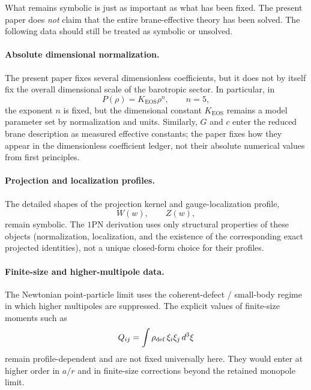 \documentclass[11pt]{article}
\newcommand{\Wproj}{W}
\newcommand{\Zloc}{Z}
\newcommand{\KEOS}{K_{\mathrm{EOS}}}
\begin{document}
What remains symbolic is just as important as what has been fixed. The present paper does
\emph{not} claim that the entire brane-effective theory has been solved. The following
data should still be treated as symbolic or unsolved.

\paragraph{Absolute dimensional normalization.}
The present paper fixes several dimensionless coefficients, but it does not by itself fix
the overall dimensional scale of the barotropic sector. In particular, in
\begin{equation}
P(\rho)=\KEOS \rho^n,
\qquad n=5,
\label{eq:symbolic-KEOS}
\end{equation}
the exponent \(n\) is fixed, but the dimensional constant \(\KEOS\) remains a model
parameter set by normalization and units. Similarly, \(G\) and \(c\) enter the reduced
brane description as measured effective constants; the paper fixes how they appear in the
dimensionless coefficient ledger, not their absolute numerical values from first
principles.

\paragraph{Projection and localization profiles.}
The detailed shapes of the projection kernel and gauge-localization profile,
\begin{equation}
\Wproj(w),
\qquad
\Zloc(w),
\label{eq:symbolic-profiles}
\end{equation}
remain symbolic. The \(1\)PN derivation uses only structural properties of these objects
(normalization, localization, and the existence of the corresponding exact projected
identities), not a unique closed-form choice for their profiles.

\paragraph{Finite-size and higher-multipole data.}
The Newtonian point-particle limit uses the coherent-defect / small-body regime in which
higher multipoles are suppressed. The explicit values of finite-size moments such as
\begin{equation}
Q_{ij}=\int \rho_{\rm def}\,\xi_i\xi_j\,d^3\xi
\label{eq:symbolic-finite-size}
\end{equation}
remain profile-dependent and are not fixed universally here. They would enter at higher
order in \(a/r\) and in finite-size corrections beyond the retained monopole limit.
\end{document}
